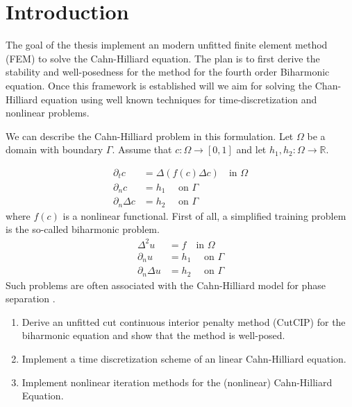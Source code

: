 \section{Introduction}\label{sec:introduction}
The goal of the thesis implement an modern unfitted finite element method (FEM) to solve the Cahn-Hilliard equation. The plan is to first derive the stability and well-posedness for the method for the fourth order Biharmonic equation. Once this framework is established will we aim for solving the Chan-Hilliard equation using well known techniques for time-discretization and nonlinear problems.

We can describe the Cahn-Hilliard problem in this formulation. Let $\Omega  $ be a domain with boundary $\Gamma $. Assume that $c: \Omega  \to \left[ 0,1 \right] $ and let $h_{1},h_{2}:\Omega  \to \mathbb{R} $.

\[
    \begin{split}
\partial _{t} c &= \Delta ( f(c) \Delta c)     \quad  \text{in } \Omega \\
\partial _{n} c & = h_{1} \quad \text{ on } \Gamma  \\
\partial _{n} \Delta c  & = h_{2} \quad \text{ on } \Gamma
    \end{split}
\]
where $f( c) $ is a nonlinear functional. First of all, a simplified training problem is the so-called biharmonic problem.
\[
    \begin{split}
\Delta ^2 u & = f \quad  \text{in } \Omega \\
\partial _{n} u & = h_{1} \quad \text{ on } \Gamma  \\
\partial _{n} \Delta u  & = h_{2} \quad \text{ on } \Gamma
    \end{split}
\]
Such problems are often associated with the Cahn-Hilliard model
for phase separation \cite{cahnhilliard1957} .



\begin{enumerate}[label=(\alph*)]
    \item Derive an unfitted cut continuous interior penalty method (CutCIP) for the biharmonic equation and show that the method is well-posed.
    \item Implement a time discretization scheme of an linear Cahn-Hilliard equation.
    \item Implement nonlinear iteration methods for the (nonlinear) Cahn-Hilliard Equation.
\end{enumerate}




